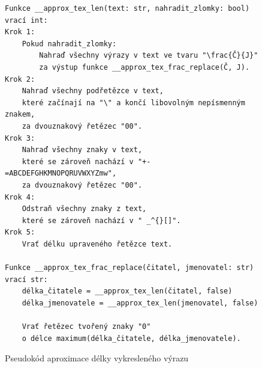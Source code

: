 \documentclass[FM]{tulthesis}
\begin{document}
	\begin{figure}[ht]
		\begin{lstlisting}[language=Pseudo1]
Funkce __approx_tex_len(text: str, nahradit_zlomky: bool) vrací int:
Krok 1:
	Pokud nahradit_zlomky:
		Nahraď všechny výrazy v text ve tvaru "\frac{Č}{J}"
		za výstup funkce __approx_tex_frac_replace(Č, J).
Krok 2:
	Nahraď všechny podřetězce v text,
	které začínají na "\" a končí libovolným nepísmenným znakem,
	za dvouznakový řetězec "00".
Krok 3:
	Nahraď všechny znaky v text,
	které se zároveň nachází v "+-=ABCDEFGHKMNOPQRUVWXYZmw",
	za dvouznakový řetězec "00".
Krok 4:
	Odstraň všechny znaky z text,
	které se zároveň nachází v " _^{}[]".
Krok 5:
	Vrať délku upraveného řetězce text.
	
Funkce __approx_tex_frac_replace(čitatel, jmenovatel: str) vrací str:
	délka_čitatele = __approx_tex_len(čitatel, false)
	délka_jmenovatele = __approx_tex_len(jmenovatel, false)

	Vrať řetězec tvořený znaky "0"
	o délce maximum(délka_čitatele, délka_jmenovatele).
		\end{lstlisting}
		\caption{Pseudokód aproximace délky vykresleného výrazu}
	\end{figure}
	
\end{document}
